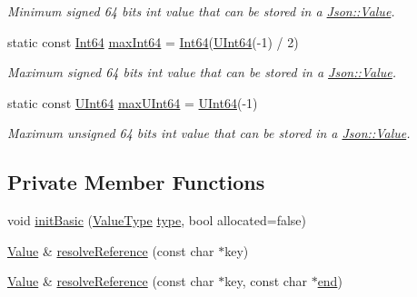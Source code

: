 \begin{DoxyCompactItemize}
\begin{DoxyCompactList}\small\item\em Minimum signed 64 bits int value that can be stored in a \hyperlink{class_json_1_1_value}{Json\+::\+Value}. \end{DoxyCompactList}\item 
static const \hyperlink{class_json_1_1_value_a1b86af9f85f0f1baa972c3319fa22695}{Int64} \hyperlink{class_json_1_1_value_a4492634870b8c5709ce967b384ac6006}{max\+Int64} = \hyperlink{class_json_1_1_value_a1b86af9f85f0f1baa972c3319fa22695}{Int64}(\hyperlink{class_json_1_1_value_a8b62564be8c087c6d18de180ff4e13e3}{U\+Int64}(-\/1) / 2)
\begin{DoxyCompactList}\small\item\em Maximum signed 64 bits int value that can be stored in a \hyperlink{class_json_1_1_value}{Json\+::\+Value}. \end{DoxyCompactList}\item 
static const \hyperlink{class_json_1_1_value_a8b62564be8c087c6d18de180ff4e13e3}{U\+Int64} \hyperlink{class_json_1_1_value_ae1eb89c305c39516696ff305cffa01da}{max\+U\+Int64} = \hyperlink{class_json_1_1_value_a8b62564be8c087c6d18de180ff4e13e3}{U\+Int64}(-\/1)
\begin{DoxyCompactList}\small\item\em Maximum unsigned 64 bits int value that can be stored in a \hyperlink{class_json_1_1_value}{Json\+::\+Value}. \end{DoxyCompactList}\end{DoxyCompactItemize}
\subsection*{Private Member Functions}
\begin{DoxyCompactItemize}
\item 
void \hyperlink{class_json_1_1_value_a32b86b71564157f40f880f5736be822a}{init\+Basic} (\hyperlink{namespace_json_a7d654b75c16a57007925868e38212b4e}{Value\+Type} \hyperlink{class_json_1_1_value_a8ce61157a011894f0252ceed232312de}{type}, bool allocated=false)
\item 
\hyperlink{class_json_1_1_value}{Value} \& \hyperlink{class_json_1_1_value_a9ff9cdae2c8f4155bab603d750b0b3f1}{resolve\+Reference} (const char $\ast$key)
\item 
\hyperlink{class_json_1_1_value}{Value} \& \hyperlink{class_json_1_1_value_a5f6b3aaf4f2e952a33dd823db008c333}{resolve\+Reference} (const char $\ast$key, const char $\ast$\hyperlink{class_json_1_1_value_a3e443cd0ef24f7e028b175e47ee045e0}{end})
\end{DoxyCompactItemize}
